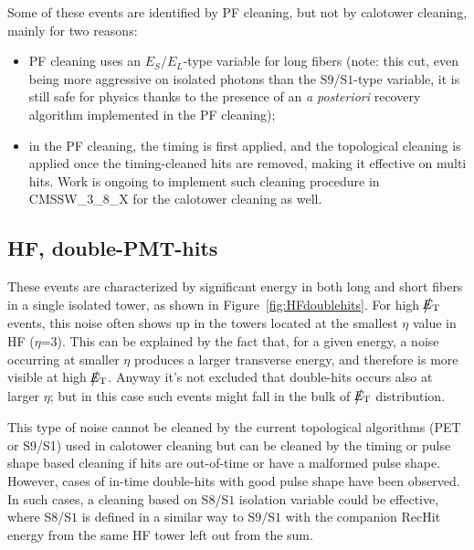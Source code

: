 Some of these events are identified by PF cleaning, but not by calotower cleaning, mainly for two reasons:
\begin{itemize}
\item PF cleaning uses an $E_S$/$E_L$-type variable for long fibers (note: this cut, even being more aggressive on isolated photons 
than the S$9$/S$1$-type variable, it is still safe for physics thanks to the presence of an {\it a posteriori} recovery algorithm
implemented in the PF cleaning);
\item in the PF cleaning, the timing is first applied, and the topological cleaning is applied once 
the timing-cleaned hits are removed, making it effective on multi hits. 
Work is ongoing to implement such cleaning procedure in CMSSW\_3\_8\_X for the calotower cleaning as well.
\end{itemize}

\subsection{HF, double-PMT-hits}
These events are characterized by significant energy in both long and short fibers in a single
isolated tower, as shown in Figure~\ref{fig:HFdoublehits}. For high $\big\slash\hspace{-1.6ex}{E_\text{T}}$ events, 
this noise often shows up in the towers located at the smallest $\eta$ 
value in HF ($\eta$=3). This can be explained by the fact that, for a given energy, 
a noise occurring at smaller $\eta$ produces a larger transverse energy, and therefore is more visible at high $\big\slash\hspace{-1.6ex}{E_\text{T}}$.
Anyway it's not excluded that double-hits occurs also at larger $\eta$; but in this case such events might 
fall in the bulk of $\big\slash\hspace{-1.6ex}{E_\text{T}}$ distribution.

This type of noise cannot be cleaned by the current topological algorithms (PET or S9/S1) used in calotower cleaning 
but can be cleaned by the timing or pulse shape based cleaning if hits are out-of-time or have a malformed pulse shape.
However, cases of in-time double-hits with good pulse shape have been observed. In such cases, a cleaning based on
S$8$/S$1$ isolation variable could be effective, where S$8$/S$1$ is defined in a similar way to S$9$/S$1$
with the companion RecHit energy from the same HF tower left out from the sum. 

